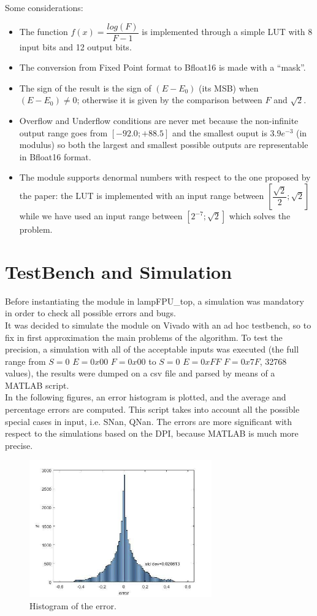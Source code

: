 \documentclass{report}
\begin{document}
\newline
Some considerations:
\begin{itemize}
\item The function $f(x)=\dfrac{log(F)}{F-1}$ is implemented through a simple LUT with 8 input bits and 12 output bits.
\item The conversion from Fixed Point format to Bfloat16 is made with a “mask”.
\item The sign of the result is the sign of $(E-E_{0})$ (its MSB) when $(E-E_{0})\neq0$; otherwise it is given by the comparison between $F$ and $\sqrt{2}$.
\item Overflow and Underflow conditions are never met because the non-infinite output range goes from $[-92.0; +88.5]$ and the smallest ouput is $3.9e^{-3}$ (in modulus) so both the largest and smallest possible outputs are representable in Bfloat16 format.
\item The module supports denormal numbers with respect to the one proposed by the paper: the LUT is  implemented with an input range between $[\dfrac{\sqrt{2}}{2}; \sqrt{2}]$ while we have used an input range between $[2^{-7};\sqrt{2}]$ which solves the problem.    
\end{itemize}
    

\chapter{TestBench and Simulation}
Before instantiating the module in lampFPU\_top, a simulation was mandatory in order to check all possible errors and bugs.
\\It was decided to simulate the module on Vivado with an ad hoc testbench, so to fix in first approximation the main problems of the algorithm. To test the precision, a simulation with all of the acceptable inputs was executed (the full range from $S=0$  $E=0x00$  $F=0x00$ to $S=0$  $E=0xFF$  $F=0x7F$, 32768 values), the results were dumped on a csv file and parsed by means of a MATLAB script.
\\In the following figures, an error histogram is plotted, and the average and percentage errors are computed.
This script takes into account all the possible special cases in input, i.e. SNan, QNan.
The errors are more significant with respect to the simulations based on the DPI, because MATLAB is much more precise.
\begin{figure}[ht]
  \centering
    \includegraphics[width=0.7\textwidth]{images/hist.jpg}
    \caption{Histogram of the error.}
\end{figure}
    
\end{document}
